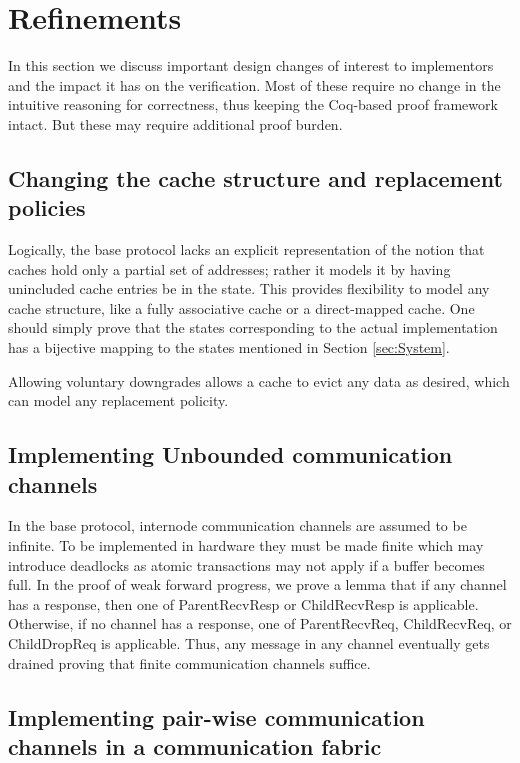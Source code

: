 \section{Refinements}
\label{sec:Refinements}

In this section we discuss important design changes of interest to implementors
and the impact it has on the verification. Most of these require no change in
the intuitive reasoning for correctness, thus keeping the Coq-based proof
framework intact. But these may require additional proof burden.


\subsection{Changing the cache structure and replacement policies}

Logically, the base protocol lacks an explicit representation of the notion
that caches hold only a partial set of addresses; rather it models it by having
unincluded cache entries be in the \In{} state. This provides
flexibility to model any cache structure, like a fully associative cache or a
direct-mapped cache. One should simply prove that the states corresponding to
the actual implementation has a bijective mapping to the states mentioned in
Section \ref{sec:System}.

Allowing voluntary downgrades allows a cache to evict any
data as desired, which can model any replacement policity.

\subsection{Implementing Unbounded communication channels}

In the base protocol, internode communication channels are assumed to be
infinite. To be implemented in hardware they must be made finite which may
introduce deadlocks as atomic transactions may not apply if a buffer becomes
full. In the proof of weak forward progress, we prove a lemma that if any
channel has a response, then one of ParentRecvResp or ChildRecvResp is
applicable. Otherwise, if no channel has a response, one of ParentRecvReq,
ChildRecvReq, or ChildDropReq is applicable. Thus, any message in any channel
eventually gets drained proving that finite communication channels suffice.

\subsection{Implementing pair-wise communication channels in a communication
fabric}

